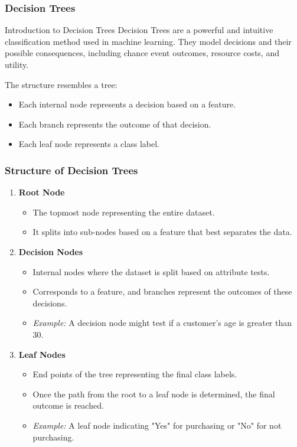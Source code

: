\documentclass[aspectratio=169]{beamer}
\begin{document}
\begin{frame}[fragile]
  \frametitle{Decision Trees}
  
  \begin{block}{Introduction to Decision Trees}
    Decision Trees are a powerful and intuitive classification method used in machine learning. They model decisions and their possible consequences, including chance event outcomes, resource costs, and utility. 
  \end{block}
  
  The structure resembles a tree:
  \begin{itemize}
    \item Each internal node represents a decision based on a feature.
    \item Each branch represents the outcome of that decision.
    \item Each leaf node represents a class label.
  \end{itemize}
\end{frame}

\begin{frame}[fragile]
  \frametitle{Structure of Decision Trees}

  \begin{enumerate}
    \item \textbf{Root Node}
      \begin{itemize}
        \item The topmost node representing the entire dataset.
        \item It splits into sub-nodes based on a feature that best separates the data.
      \end{itemize}

    \item \textbf{Decision Nodes}
      \begin{itemize}
        \item Internal nodes where the dataset is split based on attribute tests.
        \item Corresponds to a feature, and branches represent the outcomes of these decisions.
        \item \textit{Example:} A decision node might test if a customer's age is greater than 30.
      \end{itemize}

    \item \textbf{Leaf Nodes}
      \begin{itemize}
        \item End points of the tree representing the final class labels.
        \item Once the path from the root to a leaf node is determined, the final outcome is reached.
        \item \textit{Example:} A leaf node indicating "Yes" for purchasing or "No" for not purchasing.
      \end{itemize}
  \end{enumerate}
\end{frame}
\end{document}
